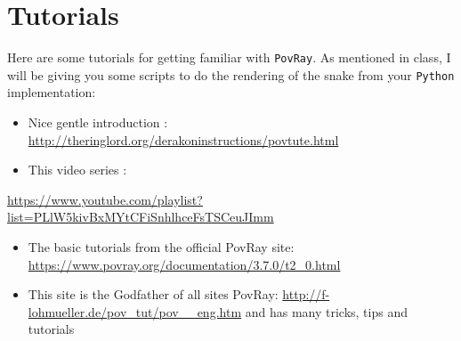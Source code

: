 \documentclass[11pt]{article}
\begin{document}
\section{Tutorials}
\label{sec:orgb02bc39}
Here are some tutorials for getting familiar with \texttt{PovRay}. As mentioned in
class, I will be giving you some scripts to do the rendering of the snake from
your \texttt{Python} implementation:
\begin{itemize}
\item Nice gentle introduction : \url{http://theringlord.org/derakoninstructions/povtute.html}
\item This video series :
\end{itemize}
\url{https://www.youtube.com/playlist?list=PLlW5kivBxMYtCFiSnhlhceFsTSCeuJImm}
\begin{itemize}
\item The basic tutorials from the official PovRay site: \url{https://www.povray.org/documentation/3.7.0/t2\_0.html}
\item This site is the Godfather of all sites PovRay:
\url{http://f-lohmueller.de/pov\_tut/pov\_\_eng.htm} and has many tricks, tips and tutorials
\end{itemize}
\end{document}

